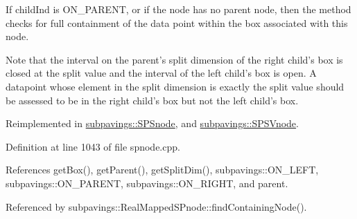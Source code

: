 \-If child\-Ind is \-O\-N\-\_\-\-P\-A\-R\-E\-N\-T, or if the node has no parent node, then the method checks for full containment of the data point within the box associated with this node.

\-Note that the interval on the parent's split dimension of the right child's box is closed at the split value and the interval of the left child's box is open. \-A datapoint whose element in the split dimension is exactly the split value should be assessed to be in the right child's box but not the left child's box. 

\-Reimplemented in \hyperlink{classsubpavings_1_1SPSnode_a918067afb150c053f7450fd18c6ecd22}{subpavings\-::\-S\-P\-Snode}, and \hyperlink{classsubpavings_1_1SPSVnode_a803d11f31d86f0565dbe682a33099698}{subpavings\-::\-S\-P\-S\-Vnode}.



\-Definition at line 1043 of file spnode.\-cpp.



\-References get\-Box(), get\-Parent(), get\-Split\-Dim(), subpavings\-::\-O\-N\-\_\-\-L\-E\-F\-T, subpavings\-::\-O\-N\-\_\-\-P\-A\-R\-E\-N\-T, subpavings\-::\-O\-N\-\_\-\-R\-I\-G\-H\-T, and parent.



\-Referenced by subpavings\-::\-Real\-Mapped\-S\-Pnode\-::find\-Containing\-Node().


